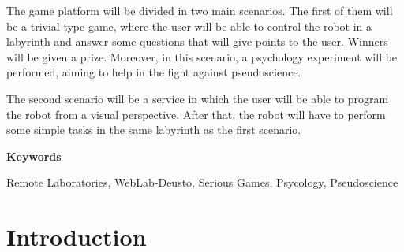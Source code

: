 \documentclass{DeustoFDP}
\begin{document}
The game platform will be divided in two main scenarios. The first of them will be a
trivial type game, where the user will be able to control the robot in a labyrinth and
answer some questions that will give points to the user. Winners will be given a prize.
Moreover, in this scenario, a psychology experiment will be performed, aiming to help in
the fight against pseudoscience.

The second scenario will be a service in which the user will be able to program the robot
from a visual perspective. After that, the robot will have to perform some simple tasks in
the same labyrinth as the first scenario.

\vspace{2em}

{\Large\bfseries\sectionfont Keywords}
\vspace{3\medskipamount}

Remote Laboratories, WebLab-Deusto, Serious Games, Psycology, Pseudoscience

\cleardoublepage\tableofcontents
\cleardoublepage\listoffigures
\cleardoublepage\listoftables
\cleardoublepage\listoflistings

\mainmatter
\pagestyle{phdthesis}

\chapter{Introduction}\label{cha:introduction}
\end{document}
